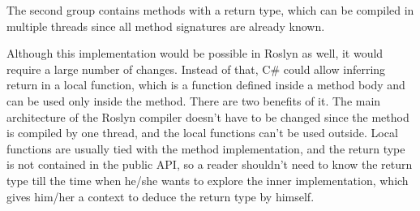 The second group contains methods with a return type, which can be compiled in multiple threads since all method signatures are already known.
\par
Although this implementation would be possible in Roslyn as well, it would require a large number of changes. 
Instead of that, C\# could allow inferring return in a local function, which is a function defined inside a method body and can be used only inside the method. 
There are two benefits of it. 
The main architecture of the Roslyn compiler doesn’t have to be changed since the method is compiled by one thread, and the local functions can’t be used outside. 
Local functions are usually tied with the method implementation, and the return type is not contained in the public API, so a reader shouldn’t need to know the return type till the time when he/she wants to explore the inner implementation, which gives him/her a context to deduce the return type by himself.


